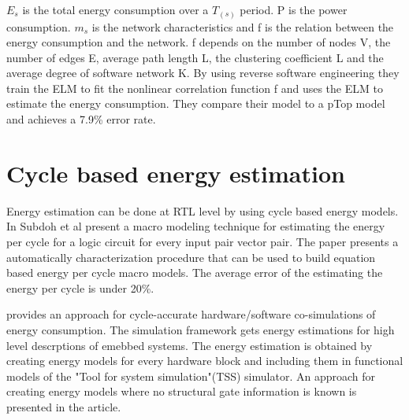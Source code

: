 $E_{s}$ is the total energy consumption over a $T_(s)$ period. P is the power consumption. $m_{s}$ is the network characteristics and f is the relation between the energy consumption and the network. f depends on the number of nodes V, the number of edges E, average path length L, the clustering coefficient L and the average degree of software network K. By using reverse software engineering they train the ELM to fit the nonlinear correlation function f and uses the ELM to estimate the energy consumption. They compare their model to a pTop model and achieves a 7.9\% error rate. 

\section{Cycle based energy estimation}
 Energy estimation can be done at RTL level by using cycle based energy models. In \cite{Energy_Gupta} Subdoh et al present a macro modeling technique for estimating the energy per cycle for a logic circuit for every input pair vector pair. The paper presents a automatically characterization procedure that can be used to build equation based energy per cycle macro models. The average error of the estimating the energy per cycle is under 20\%. \newline
 
 \cite{Energy_Ana} provides an approach for cycle-accurate hardware/software co-simulations of energy consumption. The simulation framework gets energy estimations for high level descrptions of emebbed systems. The energy estimation is obtained by creating energy models for every hardware block and including them in functional models of the "Tool for system simulation"(TSS) simulator. An approach for creating energy models where no structural gate information is known is  presented in the article. 
 
 \cite{}